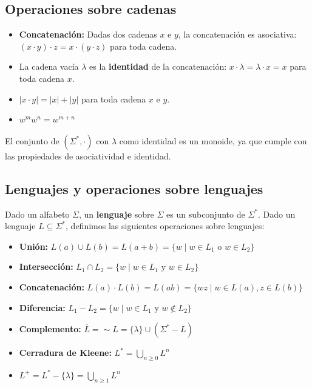 \subsection{Operaciones sobre cadenas}
\begin{Def}
\begin{itemize}
    \item \textbf{Concatenación:} Dadas dos cadenas $x$ e $y$, la concatenación es asociativa: $(x \cdot y) \cdot z = x \cdot (y \cdot z)$ para toda cadena.
    \item La cadena vacía $\lambda$ es la \textbf{identidad} de la concatenación: $x \cdot \lambda = \lambda \cdot x = x$ para toda cadena $x$.
    \item $|x \cdot y| = |x| + |y|$ para toda cadena $x$ e $y$.
    \item $w^m w^n = w^{m+n}$
\end{itemize}
    El conjunto de $(\Sigma^*, \cdot)$ con $\lambda$ como identidad es un monoide, ya que cumple con las propiedades de asociatividad e identidad.
\end{Def}

\subsection{Lenguajes y operaciones sobre lenguajes}


\begin{Def}

Dado un alfabeto $\Sigma$, un \textbf{lenguaje} sobre $\Sigma$ es un subconjunto de $\Sigma^*$. 
Dado un lenguaje $L \subseteq \Sigma^*$, definimos las siguientes operaciones sobre lenguajes:
\begin{itemize}
    \item \textbf{Unión:} $L(a) \cup L(b) = L(a+b)= \{w \mid w \in L_1 \text{ o } w \in L_2\}$
    \item \textbf{Intersección:} $L_1 \cap L_2 = \{w \mid w \in L_1 \text{ y } w \in L_2\}$
    \item \textbf{Concatenación:} $L(a) \cdot L(b) = L(ab) = \{wz \mid w \in L(a), z \in L(b)\}$
    \item \textbf{Diferencia:} $L_1 - L_2 = \{w \mid w \in L_1 \text{ y } w \notin L_2\}$
    \item \textbf{Complemento:} $\overline{L} = \sim L = \{\lambda\} \cup (\Sigma^* - L)$
    \item \textbf{Cerradura de Kleene:} $L^* = \bigcup_{n \geq 0} L^n$
    \item $L^+ = L^* - \{\lambda\} = \bigcup_{n \geq 1} L^n$
\end{itemize}
\end{Def}

